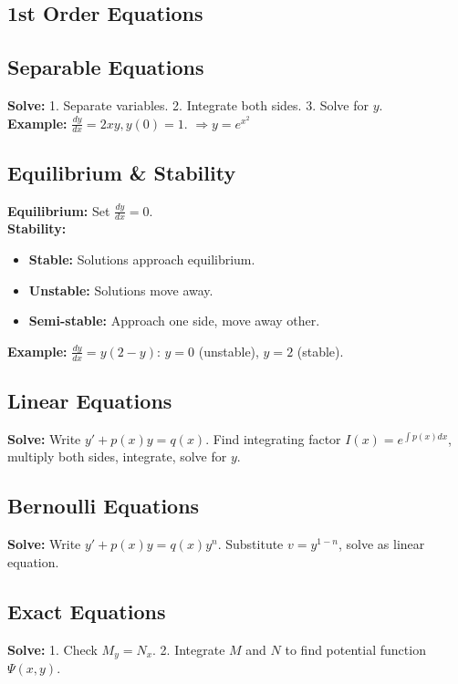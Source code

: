 \maketitle
\begin{multicols}{2}

\section*{1st Order Equations}
\subsection*{Separable Equations}
\textbf{Solve:} 
1. Separate variables. 2. Integrate both sides. 3. Solve for \( y \). \\
\textbf{Example:} \( \frac{dy}{dx} = 2xy, y(0)=1 \). \(\Rightarrow y = e^{x^2}\)

\subsection*{Equilibrium \& Stability}
\textbf{Equilibrium:} Set \( \frac{dy}{dx} = 0 \). \\
\textbf{Stability:} 
\begin{itemize}
    \item \textbf{Stable:} Solutions approach equilibrium.
    \item \textbf{Unstable:} Solutions move away.
    \item \textbf{Semi-stable:} Approach one side, move away other.
\end{itemize}
\textbf{Example:} \( \frac{dy}{dx} = y(2-y) \): \( y=0 \) (unstable), \( y=2 \) (stable).

\subsection*{Linear Equations}
\textbf{Solve:} Write \( y' + p(x)y = q(x) \). Find integrating factor \( I(x) = e^{\int p(x)dx} \), multiply both sides, integrate, solve for \( y \).

\subsection*{Bernoulli Equations}
\textbf{Solve:} Write \( y' + p(x)y = q(x)y^n \). Substitute \( v = y^{1-n} \), solve as linear equation.

\subsection*{Exact Equations}
\textbf{Solve:} 
1. Check \( M_y = N_x \). 
2. Integrate \( M \) and \( N \) to find potential function \( \Psi(x,y) \).


\end{multicols}
